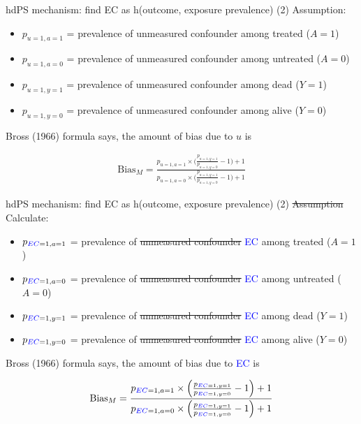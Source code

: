 \documentclass[
  ignorenonframetext,
  aspectratio=169]{beamer}
\providecommand{\tightlist}{%
  \setlength{\itemsep}{0pt}\setlength{\parskip}{0pt}}
\begin{document}
\begin{frame}{hdPS mechanism: find EC as h(outcome, exposure prevalence)
(2)}
\protect\hypertarget{hdps-mechanism-find-ec-as-houtcome-exposure-prevalence-2}{}
Assumption:

\begin{itemize}
\tightlist
\item
  \(p_{u=1,a=1}\) = prevalence of unmeasured confounder among treated
  (\(A=1\))
\item
  \(p_{u=1,a=0}\) = prevalence of unmeasured confounder among untreated
  (\(A=0\))
\item
  \(p_{u=1,y=1}\) = prevalence of unmeasured confounder among dead
  (\(Y=1\))
\item
  \(p_{u=1,y=0}\) = prevalence of unmeasured confounder among alive
  (\(Y=0\))
\end{itemize}

Bross (1966) formula says, the amount of bias due to \(u\) is

\begin{equation} 
\begin{aligned}
\text{Bias}_M =  \frac{ p_{u=1,a=1} \times \Big(\frac{p_{u=1,y=1}}{p_{u=1,y=0}} -1 \Big) +1  } { p_{u=1,a=0} \times  \Big(\frac{p_{u=1,y=1}}{p_{u=1,y=0}} -1 \Big) +1}   \nonumber
\end{aligned}
\end{equation}
\end{frame}

\begin{frame}{hdPS mechanism: find EC as h(outcome, exposure prevalence)
(2)}
\protect\hypertarget{hdps-mechanism-find-ec-as-houtcome-exposure-prevalence-2-1}{}
\st{Assumption} Calculate:

\begin{itemize}
\tightlist
\item
  \(p_{\textcolor{blue}{EC}=1,a=1}\) = prevalence of
  \st{unmeasured confounder} \textcolor{blue}{EC} among treated
  (\(A=1\))
\item
  \(p_{\textcolor{blue}{EC}=1,a=0}\) = prevalence of
  \st{unmeasured confounder} \textcolor{blue}{EC} among untreated
  (\(A=0\))
\item
  \(p_{\textcolor{blue}{EC}=1,y=1}\) = prevalence of
  \st{unmeasured confounder} \textcolor{blue}{EC} among dead (\(Y=1\))
\item
  \(p_{\textcolor{blue}{EC}=1,y=0}\) = prevalence of
  \st{unmeasured confounder} \textcolor{blue}{EC} among alive (\(Y=0\))
\end{itemize}

Bross (1966) formula says, the amount of bias due to
\textcolor{blue}{EC} is

\begin{equation} 
\begin{aligned}
\text{Bias}_M =  \frac{ p_{\textcolor{blue}{EC}=1,a=1} \times \Big(\frac{p_{\textcolor{blue}{EC}=1,y=1}}{p_{\textcolor{blue}{EC}=1,y=0}} -1 \Big) +1  } { p_{\textcolor{blue}{EC}=1,a=0} \times  \Big(\frac{p_{\textcolor{blue}{EC}=1,y=1}}{p_{\textcolor{blue}{EC}=1,y=0}} -1 \Big) +1}   \nonumber
\end{aligned}
\end{equation}
\end{frame}
\end{document}
